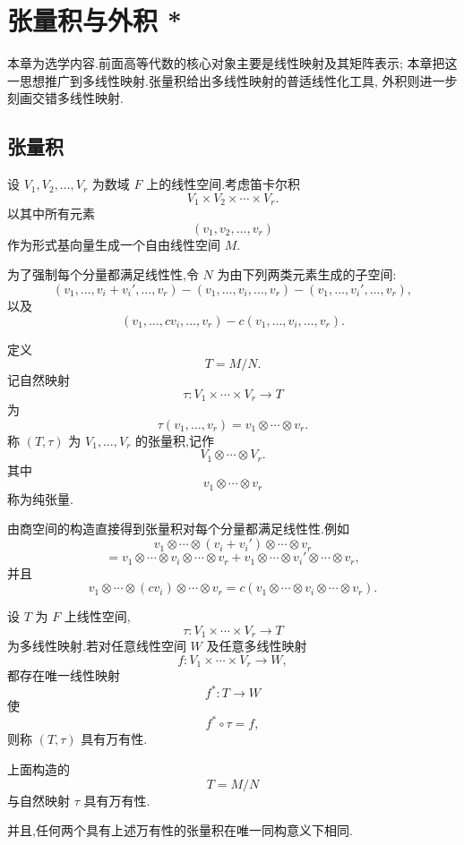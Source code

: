 \setcounter{chapter}{9}
\pagestyle{fancy}

\chapter{张量积与外积 *}

本章为选学内容.前面高等代数的核心对象主要是线性映射及其矩阵表示;
本章把这一思想推广到多线性映射.张量积给出多线性映射的普适线性化工具,
外积则进一步刻画交错多线性映射.


\section{张量积}

设 $V_1,V_2,\ldots,V_r$ 为数域 $F$ 上的线性空间.考虑笛卡尔积
\[
V_1\times V_2\times\cdots\times V_r.
\]
以其中所有元素
\[
(v_1,v_2,\ldots,v_r)
\]
作为形式基向量生成一个自由线性空间 $M$.

为了强制每个分量都满足线性性,令 $N$ 为由下列两类元素生成的子空间:
\[
(v_1,\ldots,v_i+v_i',\ldots,v_r)
-
(v_1,\ldots,v_i,\ldots,v_r)
-
(v_1,\ldots,v_i',\ldots,v_r),
\]
以及
\[
(v_1,\ldots,cv_i,\ldots,v_r)
-
c(v_1,\ldots,v_i,\ldots,v_r).
\]

\begin{definition}[张量积]
定义
\[
T=M/N.
\]
记自然映射
\[
\tau:
V_1\times\cdots\times V_r
\longrightarrow T
\]
为
\[
\tau(v_1,\ldots,v_r)
=
v_1\otimes\cdots\otimes v_r.
\]
称 $(T,\tau)$ 为 $V_1,\ldots,V_r$ 的张量积,记作
\[
V_1\otimes\cdots\otimes V_r.
\]
其中
\[
v_1\otimes\cdots\otimes v_r
\]
称为纯张量.
\end{definition}

由商空间的构造直接得到张量积对每个分量都满足线性性.例如
\[
v_1\otimes\cdots\otimes(v_i+v_i')\otimes\cdots\otimes v_r
\]
\[
=
v_1\otimes\cdots\otimes v_i\otimes\cdots\otimes v_r
+
v_1\otimes\cdots\otimes v_i'\otimes\cdots\otimes v_r,
\]
并且
\[
v_1\otimes\cdots\otimes(cv_i)\otimes\cdots\otimes v_r
=
c(v_1\otimes\cdots\otimes v_i\otimes\cdots\otimes v_r).
\]


\begin{definition}[万有性]
设 $T$ 为 $F$ 上线性空间,
\[
\tau:
V_1\times\cdots\times V_r\to T
\]
为多线性映射.若对任意线性空间 $W$ 及任意多线性映射
\[
f:
V_1\times\cdots\times V_r\to W,
\]
都存在唯一线性映射
\[
f^*:T\to W
\]
使
\[
f^*\circ\tau=f,
\]
则称 $(T,\tau)$ 具有万有性.
\end{definition}


\begin{theorem}
上面构造的
\[
T=M/N
\]
与自然映射 $\tau$ 具有万有性.

并且,任何两个具有上述万有性的张量积在唯一同构意义下相同.
\end{theorem}

